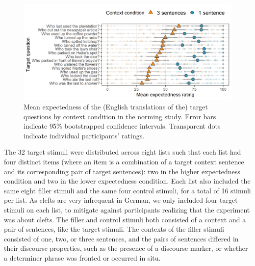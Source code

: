 \documentclass{salt}
\begin{document}
\begin{figure}[]
\centering
\includegraphics[width=\textwidth]{results_norming_by_question.png}
\caption{Mean expectedness of the (English translations of the) target questions by context condition in the norming
study. Error bars indicate 95\% bootstrapped confidence intervals. Transparent
dots indicate individual participants' ratings.}\label{fig:results_exp1}
\end{figure}

The 32 target stimuli were distributed across eight lists such that each list had four distinct items (where an item is a combination of a target context sentence and its corresponding pair of target sentences): two in the higher expectedness condition and two in the lower expectedness condition. Each list also included the same eight filler stimuli and the same four control stimuli, for a total of 16 stimuli per list. As clefts are very infrequent in German, we only included four target stimuli on each list, to mitigate against participants realizing that the experiment was about clefts. The filler and control stimuli both consisted of a context and a pair of sentences, like the target stimuli. The contexts of the filler stimuli consisted of one, two, or three sentences, and the pairs of sentences differed in their discourse properties, such as the presence of a discourse marker, or whether a determiner phrase was fronted or occurred in situ. 
\end{document}
